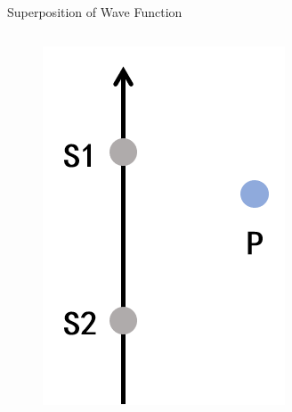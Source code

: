 \documentclass{beamer}
\begin{document}




\begin{frame}{Superposition of Wave Function}
    \begin{columns}
        \begin{column}{.1\linewidth}
            \begin{figure}[htbp]
                \centering
                \includegraphics[width=\linewidth]{images/super.png}
            \end{figure}
        \end{column}
            

\end{columns}
\end{frame}
\end{document}
